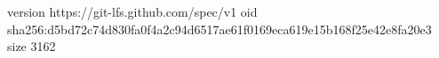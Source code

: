 version https://git-lfs.github.com/spec/v1
oid sha256:d5bd72c74d830fa0f4a2c94d6517ae61f0169eca619e15b168f25e42e8fa20e3
size 3162

